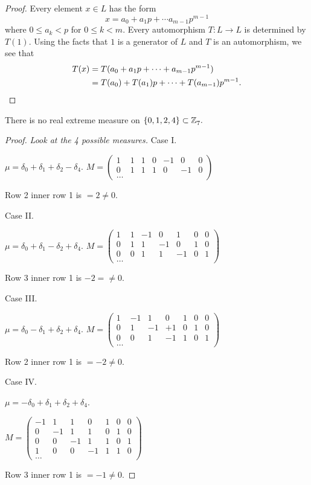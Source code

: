 \begin{proof}
Every element $x\in L$ has the form
\[
x=
a_0+a_1p+\cdots a_{m-1}p^{m-1}
\]
where $0\le a_k<p$ for $0\le k <m$.
Every automorphism $T:L\to L$ is determined by $T(1)$.  Using the facts that $1$ is
a generator of $L$ and $T$ is an automorphism, we see that 
\begin{align}
T(x) &= T{(}a_0+a_1p+\cdots+a_{m-1}p^{m-1}{)}
\\&
= T(a_0)+T(a_1)p+\cdots+T(a_{m-1})p^{m-1}.
\end{align}
\end{proof}

\begin{prop}There is no real extreme measure on $\{0,1,2,4\}\subset\texttt{$\mathbb Z_{7}^{\,}$}.$
\end{prop}
\begin{proof}
\textit{Look at the 4 possible measures.}
Case I.

$\mu=\delta_0+\delta_1+\delta_2-\delta_4.$
$M=\begin{pmatrix}
1&1&1&0&-1&0&0\\
0&1&1&1&0&-1&0\\
\dots
\end{pmatrix}
$

Row 2 inner row 1 is  $=2\ne0$.

\smallskip

Case II.

$\mu=\delta_0+\delta_1-\delta_2+\delta_4.$
$M=\begin{pmatrix}
1&1&-1&0&1&0&0\\
0&1&1&-1&0&1&0\\
0&0&1&1&-1&0&1\\
\dots
\end{pmatrix}
$

Row 3 inner row 1 is $-2=\ne 0$.

\smallskip

Case III.

$\mu=\delta_0-\delta_1+\delta_2+\delta_4.$
$M=\begin{pmatrix}
1&-1&1&0&1&0&0\\
0&1&-1&+1&0&1&0\\
0&0&1&-1&1&0&1\\
\dots
\end{pmatrix}
$

Row 2 inner row 1 is $=-2\ne 0$.

\smallskip

Case IV.


$\mu=-\delta_0+\delta_1+\delta_2+\delta_4.$

$M=\begin{pmatrix}
-1&1&1&0&1&0&0\\
0&-1&1&1&0&1&0\\
0&0&-1&1&1&0&1\\
1&0&0&-1&1&1&0\\
\dots
\end{pmatrix}
$

Row 3 inner row 1 is $=-1\ne 0$.
\qedhere
\end{proof}

